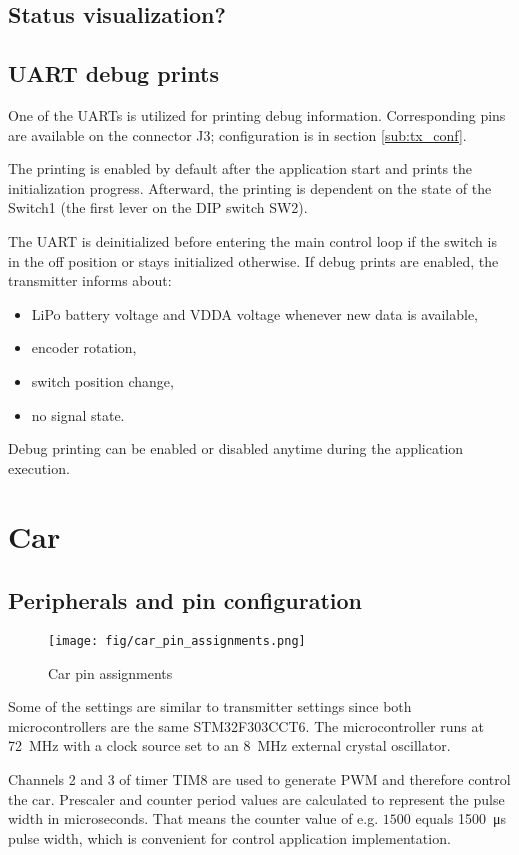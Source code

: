\subsection{Status visualization?}
\todo

\subsection{UART debug prints}
One of the UARTs is utilized for printing debug information. Corresponding pins are available on the connector J3; configuration is in section \ref{sub:tx_conf}.

The printing is enabled by default after the application start and prints the initialization progress. Afterward, the printing is dependent on the state of the Switch1 (the first lever on the DIP switch SW2).

The UART is deinitialized before entering the main control loop if the switch is in the off position or stays initialized otherwise. If debug prints are enabled, the transmitter informs about:
\begin{itemize}
\item LiPo battery voltage and VDDA voltage whenever new data is available,
\item encoder rotation,
\item switch position change,
\item no signal state.
\end{itemize}
Debug printing can be enabled or disabled anytime during the application execution.



\section{Car}
\subsection{Peripherals and pin configuration}
\begin{figure}[t]
\centering
\texttt{[image: fig/car\_pin\_assignments.png]}
\caption{Car pin assignments}
\label{fig:car_conf}
\end{figure}
Some of the settings are similar to transmitter settings since both microcontrollers are the same STM32F303CCT6. The microcontroller runs at \SI{72}{\MHz} with a clock source set to an \SI{8}{\MHz} external crystal oscillator.

Channels 2 and 3 of timer TIM8 are used to generate PWM and therefore control the car. Prescaler and counter period values are calculated to represent the pulse width in microseconds. That means the counter value of e.g. $1500$ equals \SI{1500}{\micro\second} pulse width, which is convenient for control application implementation.

